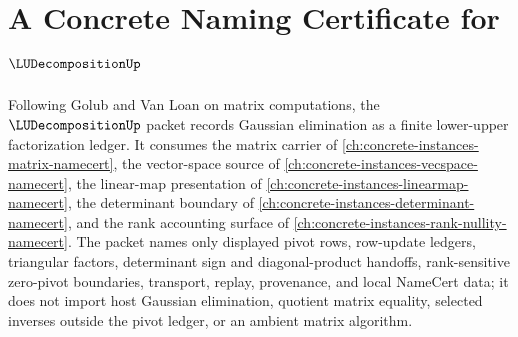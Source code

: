 \chapter{A Concrete Naming Certificate for $\LUDecompositionUp$}
\label{ch:concrete-instances-lu-decomposition-namecert}

Following Golub and Van Loan on matrix computations, the $\LUDecompositionUp$ packet records Gaussian elimination as a finite lower-upper factorization ledger. It consumes the matrix carrier of \autoref{ch:concrete-instances-matrix-namecert}, the vector-space source of \autoref{ch:concrete-instances-vecspace-namecert}, the linear-map presentation of \autoref{ch:concrete-instances-linearmap-namecert}, the determinant boundary of \autoref{ch:concrete-instances-determinant-namecert}, and the rank accounting surface of \autoref{ch:concrete-instances-rank-nullity-namecert}. The packet names only displayed pivot rows, row-update ledgers, triangular factors, determinant sign and diagonal-product handoffs, rank-sensitive zero-pivot boundaries, transport, replay, provenance, and local NameCert data; it does not import host Gaussian elimination, quotient matrix equality, selected inverses outside the pivot ledger, or an ambient matrix algorithm.

